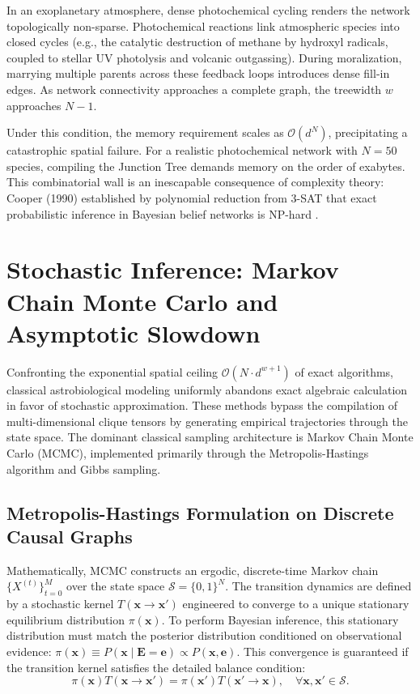 

In an exoplanetary atmosphere, dense photochemical cycling renders the network topologically non-sparse. Photochemical reactions link atmospheric species into closed cycles (e.g., the catalytic destruction of methane by hydroxyl radicals, coupled to stellar UV photolysis and volcanic outgassing). During moralization, marrying multiple parents across these feedback loops introduces dense fill-in edges. As network connectivity approaches a complete graph, the treewidth $w$ approaches $N - 1$. 

Under this condition, the memory requirement scales as $\mathcal{O}(d^N)$, precipitating a catastrophic spatial failure. For a realistic photochemical network with $N = 50$ species, compiling the Junction Tree demands memory on the order of exabytes. This combinatorial wall is an inescapable consequence of complexity theory: Cooper (1990) established by polynomial reduction from 3-SAT that exact probabilistic inference in Bayesian belief networks is NP-hard \cite{cooper1990}.

\section{Stochastic Inference: Markov Chain Monte Carlo and Asymptotic Slowdown}\label{sec:stochastic_inference_mcmc}

Confronting the exponential spatial ceiling $\mathcal{O}(N \cdot d^{w+1})$ of exact algorithms, classical astrobiological modeling uniformly abandons exact algebraic calculation in favor of stochastic approximation. These methods bypass the compilation of multi-dimensional clique tensors by generating empirical trajectories through the state space. The dominant classical sampling architecture is Markov Chain Monte Carlo (MCMC), implemented primarily through the Metropolis-Hastings algorithm and Gibbs sampling.

\subsection{Metropolis-Hastings Formulation on Discrete Causal Graphs}
Mathematically, MCMC constructs an ergodic, discrete-time Markov chain $\{X^{(t)}\}_{t=0}^M$ over the state space $\mathcal{S} = \{0, 1\}^N$. The transition dynamics are defined by a stochastic kernel $T(\mathbf{x} \to \mathbf{x}')$ engineered to converge to a unique stationary equilibrium distribution $\pi(\mathbf{x})$. To perform Bayesian inference, this stationary distribution must match the posterior distribution conditioned on observational evidence: $\pi(\mathbf{x}) \equiv P(\mathbf{x} \mid \mathbf{E} = \mathbf{e}) \propto P(\mathbf{x}, \mathbf{e})$. This convergence is guaranteed if the transition kernel satisfies the detailed balance condition:
\begin{equation}
\pi(\mathbf{x}) T(\mathbf{x} \to \mathbf{x}') = \pi(\mathbf{x}') T(\mathbf{x}' \to \mathbf{x}), \quad \forall \mathbf{x}, \mathbf{x}' \in \mathcal{S}.
\label{eq:detailed_balance_ch2}
\end{equation}


